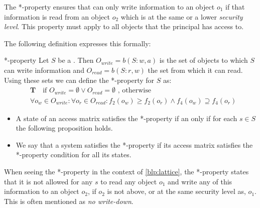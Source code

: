 The *-property ensures that \principals{} can only write information to an object $o_1$ if that information is read from an object $o_2$ which is at the same or a lower \emph{security level}.
This property must apply to all objects that the principal has access to.

The following definition expresses this formally:
\begin{definition}{*-property}
Let $S$ be a \principal{}.
Then $O_{write} = b(S: w, a)$ is the set of objects to which $S$ can write information and $O_{read} = b(S: r,w)$ the set from which it can read.
Using these sets we can define the *-property for $S$ as:
\begin{align*}
  &\textbf{T} \quad \text{if }O_{write} = \emptyset \vee O_{read} = \emptyset \text{ , otherwise }\\
  &\forall o_w \in O_{write}: \forall o_r \in O_{read}: f_2(o_w) \geq f_2(o_r) \wedge f_4(o_w) \supseteq f_4(o_r)
\end{align*}

\begin{itemize}
  \item A state of an access matrix satisfies the *-property if an only if for each $s \in S$ the following proposition holds.
  \item We say that a system satisfies the *-property if its access matrix satisfies the *-property condition for all its states.
\end{itemize}
\end{definition}

When seeing the *-property in the context of \cref{blp:lattice}, the *-property states that it is not allowed for any \ssubject{} $s$ to read any object $o_1$ and write any of this information to an object $o_2$, if $o_2$ is not above, or at the same security level as, $o_1$.
This is often mentioned as \emph{no write-down}.
